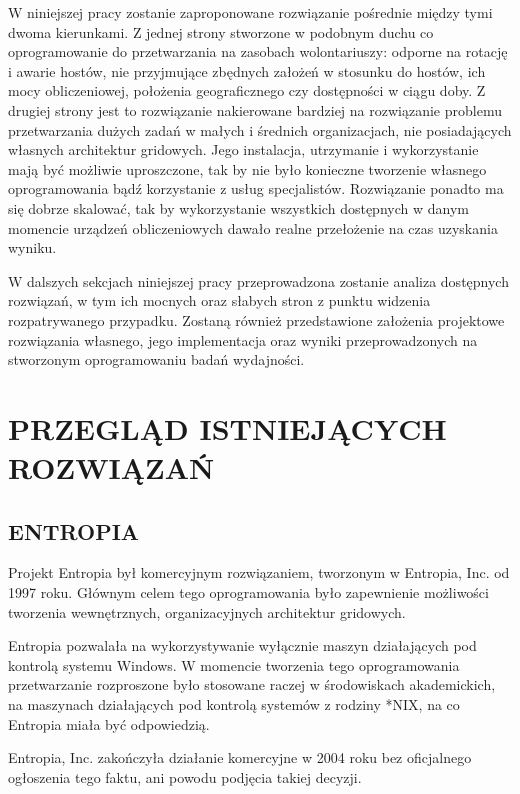 \documentclass[12pt,a4paper,twoside]{article}
\begin{document}
W niniejszej pracy zostanie zaproponowane rozwiązanie pośrednie między tymi dwoma kierunkami. Z jednej strony stworzone w podobnym duchu co oprogramowanie do przetwarzania na zasobach wolontariuszy: odporne na rotację i awarie hostów, nie przyjmujące zbędnych założeń w stosunku do hostów, ich mocy obliczeniowej, położenia geograficznego czy dostępności w ciągu doby. Z drugiej strony jest to rozwiązanie nakierowane bardziej na rozwiązanie problemu przetwarzania dużych zadań w małych i średnich organizacjach, nie posiadających własnych architektur gridowych. Jego instalacja, utrzymanie i wykorzystanie mają być możliwie uproszczone, tak by nie było konieczne tworzenie własnego oprogramowania bądź korzystanie z usług specjalistów. Rozwiązanie ponadto ma się dobrze skalować, tak by wykorzystanie wszystkich dostępnych w danym momencie urządzeń obliczeniowych dawało realne przełożenie na czas uzyskania wyniku.

W dalszych sekcjach niniejszej pracy przeprowadzona zostanie analiza dostępnych rozwiązań, w tym ich mocnych oraz słabych stron z punktu widzenia rozpatrywanego przypadku. Zostaną również przedstawione założenia projektowe rozwiązania własnego, jego implementacja oraz wyniki przeprowadzonych na stworzonym oprogramowaniu badań wydajności.


\section{PRZEGLĄD ISTNIEJĄCYCH ROZWIĄZAŃ}

\subsection{ENTROPIA}

Projekt Entropia \cite{entropia} był komercyjnym rozwiązaniem, tworzonym w Entropia, Inc. od 1997 roku. Głównym celem tego oprogramowania było zapewnienie możliwości tworzenia wewnętrznych, organizacyjnych architektur gridowych. 

Entropia pozwalała na wykorzystywanie wyłącznie maszyn działających pod kontrolą systemu Windows. W momencie tworzenia tego oprogramowania przetwarzanie rozproszone było stosowane raczej w środowiskach akademickich, na maszynach działających pod kontrolą systemów z rodziny *NIX, na co Entropia miała być odpowiedzią.

Entropia, Inc. zakończyła działanie komercyjne w 2004 roku bez oficjalnego ogłoszenia tego faktu, ani powodu podjęcia takiej decyzji.
\end{document}
